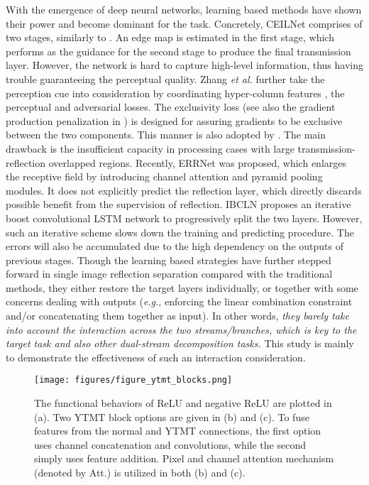 \documentclass{article}
\begin{document}
With the emergence of deep neural networks, learning based methods \cite{DBLP:conf/iccv/FanYHCW17, DBLP:conf/cvpr/ZhangNC18a,DBLP:conf/eccv/YangGLS18, DBLP:conf/cvpr/WeiYFW019, DBLP:conf/cvpr/LiY0LH20,DBLP:conf/cvpr/WenT0LHH19} have shown their power and become dominant for the task. Concretely, CEILNet \cite{DBLP:conf/iccv/FanYHCW17} comprises of two stages, similarly to \cite{DBLP:journals/pami/LevinW07,DBLP:conf/icip/WanSHK16}. An edge map is estimated in the first stage, which performs as the guidance for the second stage to produce the final transmission layer. However, the network is hard to capture high-level information, thus having trouble guaranteeing the perceptual quality. Zhang \emph{et al.} \cite{DBLP:conf/cvpr/ZhangNC18a} further take the perception cue into consideration by coordinating hyper-column features \cite{DBLP:conf/cvpr/HariharanAGM15}, the perceptual and adversarial losses. The exclusivity loss (see also the gradient production penalization in \cite{DBLP:journals/tog/Freeman15}) is designed for assuring gradients to be exclusive between the two components. This manner is also adopted by \cite{DBLP:conf/cvpr/WeiYFW019}. The main drawback is the insufficient capacity in processing cases with large transmission-reflection overlapped regions. Recently, ERRNet \cite{DBLP:conf/cvpr/WeiYFW019} 
was proposed, which enlarges the receptive field by introducing channel attention and pyramid pooling modules. It does not explicitly predict the reflection layer, which directly discards possible benefit from the supervision of reflection. IBCLN \cite{DBLP:conf/cvpr/LiY0LH20} proposes an iterative boost convolutional LSTM network to progressively split the two layers. However, such an iterative scheme slows down the training and predicting procedure. The errors will also be accumulated due to the high dependency on the outputs of previous stages. Though the learning based strategies have further stepped forward in single image reflection separation compared with the traditional methods, they either restore the target layers individually, or together with some concerns dealing with outputs (\emph{e.g.}, enforcing the linear combination constraint and/or concatenating them together as input). In other words, \emph{they barely take into account the interaction across the two streams/branches, which is key to the target task and also other dual-stream decomposition tasks.} This study is mainly to demonstrate the effectiveness of such an interaction consideration. 

\begin{figure}[t]
	\centering
	\texttt{[image: figures/figure\_ytmt\_blocks.png]}
	\caption{The functional behaviors of ReLU and negative ReLU are plotted in (a). Two YTMT block options are given in (b) and (c). To fuse features from the normal and YTMT connections, the first option uses channel concatenation and  convolutions, while the second simply uses feature addition. Pixel and channel attention mechanism (denoted by Att.) is utilized in both (b) and (c).}
	\label{figure_ytmt_blocks}
\end{figure}
\end{document}
